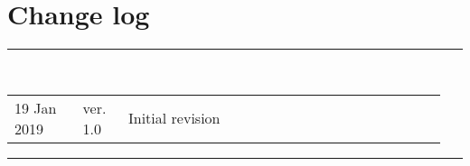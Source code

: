 \section*{\LARGE Change log}%
%
  \rule{\textwidth}{1.0pt}\\[5pt]%
  \begin{tabular}{>{\raggedright}p{0.15\linewidth}p{0.1\linewidth}p{0.7\linewidth}}
  	19 Jan 2019 & ver. 1.0 & Initial revision
  \end{tabular}\newline%
 \rule{\textwidth}{1.0pt}
